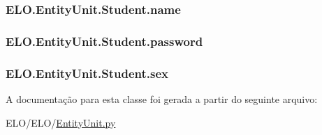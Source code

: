 \hypertarget{classELO_1_1EntityUnit_1_1Student_a33329ec1da0181f6305626b4444a8e0b}{
\subsubsection[{name}]{\setlength{\rightskip}{0pt plus 5cm}E\-L\-O.\-Entity\-Unit.\-Student.\-name}}\label{dd/d1d/classELO_1_1EntityUnit_1_1Student_a33329ec1da0181f6305626b4444a8e0b}
\hypertarget{classELO_1_1EntityUnit_1_1Student_a834cad492221bfe3f26e590666e13f9a}{
\subsubsection[{password}]{\setlength{\rightskip}{0pt plus 5cm}E\-L\-O.\-Entity\-Unit.\-Student.\-password}}\label{dd/d1d/classELO_1_1EntityUnit_1_1Student_a834cad492221bfe3f26e590666e13f9a}
\hypertarget{classELO_1_1EntityUnit_1_1Student_a5ca85c1d00044512e5dc3cfabac4ff9f}{
\subsubsection[{sex}]{\setlength{\rightskip}{0pt plus 5cm}E\-L\-O.\-Entity\-Unit.\-Student.\-sex}}\label{dd/d1d/classELO_1_1EntityUnit_1_1Student_a5ca85c1d00044512e5dc3cfabac4ff9f}


A documentação para esta classe foi gerada a partir do seguinte arquivo\-:\begin{DoxyCompactItemize}
\item 
E\-L\-O/\-E\-L\-O/\hyperlink{EntityUnit_8py}{Entity\-Unit.\-py}\end{DoxyCompactItemize}
